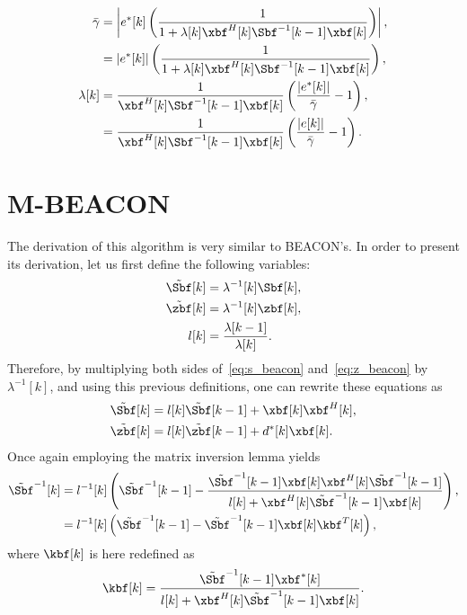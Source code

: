 \begin{align}
	\bar{\gamma} &= \left| e^*[k] \left(\frac{1}{1 + \lambda[k]\xbf^H[k]\Sbf^{-1}[k-1]\xbf[k]}\right)  \right|, \nonumber\\
	&= \vert e^*[k]\vert \left(\frac{1}{1 + \lambda[k]\xbf^H[k]\Sbf^{-1}[k-1]\xbf[k]}\right), \\
	\lambda[k] &= \frac{1}{\xbf^H[k]\Sbf^{-1}[k-1]\xbf[k]}\left(\frac{\vert e^*[k]\vert}{\bar{\gamma}} - 1\right), \nonumber \\
	&= \frac{1}{\xbf^H[k]\Sbf^{-1}[k-1]\xbf[k]}\left(\frac{\vert e[k]\vert}{\bar{\gamma}} - 1\right).\label{eq:lambda_final}
\end{align}






\section{M-BEACON}
\label{ap:MBEACON}
The derivation of this algorithm is very similar to BEACON's. In order to present its derivation, let us first define the following variables:
\begin{align}	
	\tilde{\Sbf}[k] &= \lambda^{-1}[k]\Sbf[k], \\
	\tilde{\zbf}[k] &= \lambda^{-1}[k]\zbf[k],\\
	l[k] &= \frac{\lambda[k-1]}{\lambda[k]}.\label{eq:l_MBEACON}
\end{align}
Therefore, by multiplying both sides of~\eqref{eq:s_beacon} and~\eqref{eq:z_beacon} by $\lambda^{-1}[k]$, and using this previous definitions, one can rewrite these equations as
\begin{align}
	\tilde{\Sbf}[k] &= l[k]\tilde{\Sbf}[k-1] + \xbf[k]\xbf^H[k],\\
	\tilde{\zbf}[k] &= l[k] \tilde{\zbf}[k-1] +  d^*[k]\xbf[k] \label{eq:z_beacon_2}.
\end{align}
Once again employing the matrix inversion lemma yields
\begin{align}
	\tilde{\Sbf}^{-1}[k] &= l^{-1}[k] \left(\tilde{\Sbf}^{-1}[k-1] - \frac{\tilde{\Sbf}^{-1}[k-1]\xbf[k]\xbf^H[k] \tilde{\Sbf}^{-1}[k-1]}{l[k] + \xbf^H[k]\tilde{\Sbf}^{-1}[k-1]\xbf[k]}\right),\\
	&= l^{-1}[k] \left(\tilde{\Sbf}^{-1}[k-1] - \tilde{\Sbf}^{-1}[k-1] \xbf[k] \kbf^T[k]\right),\label{eq:BEACON_matrix_2}
\end{align}
where $\kbf[k]$ is here redefined as
\begin{align}\label{eq:beaconK_2}
	\kbf[k] = \frac{\tilde{\Sbf}^{-1}[k-1]\xbf^*[k]}{l[k] + \xbf^H[k]\tilde{\Sbf}^{-1}[k-1]\xbf[k]}.
\end{align}



